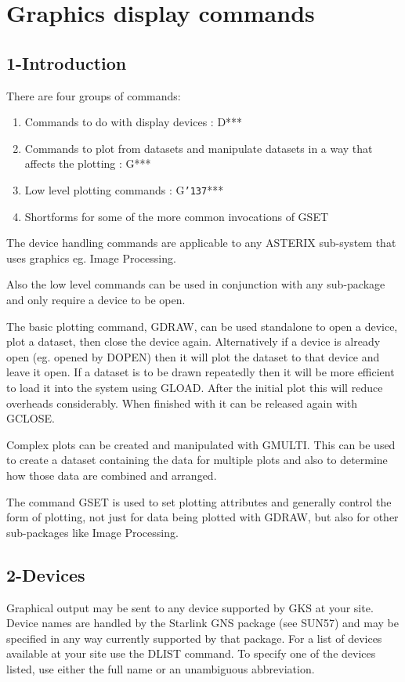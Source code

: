 \documentclass{book}
\renewcommand{\_}{{\tt\char'137}}     %
\begin{document}
\chapter{Graphics display commands}
\section{1-Introduction}
There are four groups of commands:

\begin{enumerate}
\item Commands to do with display devices : D***
\item Commands to plot from datasets and manipulate
datasets in a way that affects the plotting : G***
\item Low level plotting commands : G\_***
\item Shortforms for some of the more common
invocations of GSET
\end{enumerate}
The device handling commands are applicable to any ASTERIX
sub-system that uses graphics eg. Image Processing.

Also the low level commands can be used in conjunction with
any sub-package and only require a device to be open.

The basic plotting command, GDRAW, can be used standalone to
open a device, plot a dataset, then close the device again.
Alternatively if a device is already open (eg. opened by DOPEN)
then it will plot the dataset to that device and leave it open.
If a dataset is to be drawn repeatedly then it will be more
efficient to load it into the system using GLOAD. After the
initial plot this will reduce overheads considerably. When
finished with it can be released again with GCLOSE.

Complex plots can be created and manipulated with GMULTI.
This can be used to create a dataset containing the data
for multiple plots and also to determine how those data are
combined and arranged.

The command GSET is used to set plotting attributes and generally
control the form of plotting, not just for data being plotted with
GDRAW, but also for other sub-packages like Image Processing.

\section{2-Devices}
Graphical output may be sent to any device supported by GKS at
your site. Device names are handled by the Starlink GNS package
(see SUN57) and may be specified in any way currently supported
by that package. For a list of devices available at your site
use the DLIST command. To specify one of the devices listed,
use either the full name or an unambiguous abbreviation.
\end{document}

